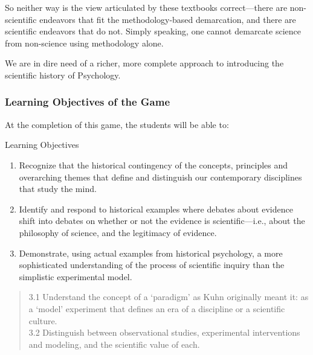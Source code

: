 \begin{refsection}
So neither way is the view articulated by these textbooks correct---there are non-scientific endeavors that fit the methodology-based demarcation, and there are scientific endeavors that do not. Simply speaking, one cannot demarcate science from non-science using methodology alone. 

We are in dire need of a richer, more complete approach to introducing the scientific history of Psychology.

\subsubsection{Learning Objectives of the Game}
\label{learningobjectivesofthegame}

At the completion of this game, the students will be able to:

\begin{apatextbox}{Learning Objectives} 

\begin{enumerate}
\item Recognize that the historical contingency of the concepts, principles and overarching themes that define and distinguish our contemporary disciplines that study the mind. \\

\item Identify and respond to historical examples where debates about evidence shift into debates on whether or not the evidence is scientific---i.e., about the philosophy of science, and the legitimacy of evidence. \\

\item Demonstrate, using actual examples from historical psychology, a more sophisticated understanding of the process of scientific inquiry than the simplistic experimental model. \\

\end{enumerate}

\begin{quote}

3.1 Understand the concept of a ‘paradigm’ as Kuhn originally meant it: as a ‘model’ experiment that defines an era of a discipline or a scientific culture. \\

3.2 Distinguish between observational studies, experimental interventions and modeling, and the scientific value of each. \\


\end{quote}
\end{apatextbox}
\end{refsection}
